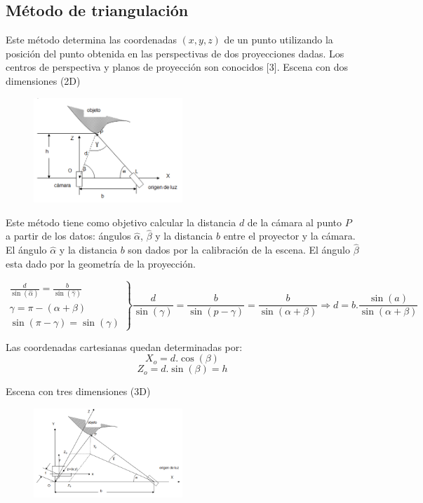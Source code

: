 \subsection{Método de triangulación}
Este método determina las coordenadas $(x,y,z)$ de un punto utilizando la posición del punto obtenida en las perspectivas de dos proyecciones dadas.
Los centros de perspectiva y planos de proyección son conocidos [3].%
Escena con dos dimensiones (2D)

\begin{figure}[H]
  \centering
    \includegraphics[width=0.5\textwidth]{./Cap6_reconstruccion/triangulacion.PNG}
  \caption{}
  \label{fig:Triangulacion}
\end{figure}

Este método tiene como objetivo calcular la distancia $d$ de la cámara al punto $P$ a partir de los datos: ángulos $\hat\alpha$, $\hat\beta$ y la distancia $b$ entre el proyector y la cámara.
El ángulo $\hat\alpha$ y la distancia $b$ son dados por la calibración de la escena.
El ángulo $\hat\beta$ esta dado por la geometría de la proyección.

\[
\left.
\begin{array}{l}
\frac{d}{\sin (\hat\alpha)} = \frac{b}{\sin (\hat\gamma)} 	\\
\gamma = \pi - (\alpha + \beta)								\\
\sin (\pi - \gamma) = \sin (\gamma)
\end{array}
\right \rbrace
\frac{d}{\sin(\gamma)} = \frac{b}{\sin(p - \gamma)} = \frac{b}{\sin(\alpha + \beta)} \Rightarrow d = b . \frac{\sin(a)}{\sin(\alpha + \beta)}
\]

Las coordenadas cartesianas quedan determinadas por:
\[
X_o = d. \cos (\beta)
\]
\[
Z_o = d. \sin (\beta) = h
\]

Escena con tres dimensiones (3D)

\begin{figure}[H]
  \centering
    \includegraphics[width=0.5\textwidth]{./Cap6_reconstruccion/triangulacion-2.PNG}
  \caption{}
  \label{fig:Triangulacion2}
\end{figure}

